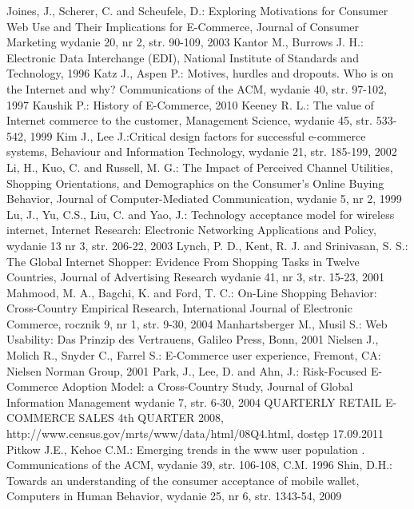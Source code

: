 {\begin{thebibliography}{5}
     Joines, J., Scherer, C. and Scheufele, D.: Exploring Motivations for Consumer Web Use and Their Implications for E-Commerce, Journal of Consumer Marketing wydanie 20, nr 2, str. 90-109, 2003
     Kantor M., Burrows J. H.: Electronic Data Interchange (EDI), National Institute of Standards and Technology, 1996
     Katz J., Aspen P.: Motives, hurdles and dropouts. Who is on the Internet and why? Communications of the ACM, wydanie 40, str. 97-102, 1997
     Kaushik P.: History of E-Commerce, 2010
     Keeney R. L.: The value of Internet commerce to the customer, Management Science, wydanie 45, str. 533-542, 1999
     Kim J., Lee J.:Critical design factors for successful e-commerce systems, Behaviour and Information Technology, wydanie 21, str. 185-199, 2002
     Li, H., Kuo, C. and Russell, M. G.: The Impact of Perceived Channel Utilities, Shopping Orientations, and Demographics on the Consumer's Online Buying Behavior, Journal of Computer-Mediated Communication, wydanie 5, nr 2, 1999
     Lu, J., Yu, C.S., Liu, C. and Yao, J.: Technology acceptance model for wireless internet, Internet Research: Electronic Networking Applications and Policy, wydanie 13 nr 3, str. 206-22, 2003
     Lynch, P. D., Kent, R. J. and Srinivasan, S. S.: The Global Internet Shopper: Evidence From Shopping Tasks in Twelve Countries, Journal of Advertising Research wydanie 41, nr 3, str. 15-23, 2001
     Mahmood, M. A., Bagchi, K. and Ford, T. C.: On-Line Shopping Behavior: Cross-Country Empirical Research, International Journal of Electronic Commerce, rocznik 9, nr 1, str. 9-30, 2004
     Manhartsberger M., Musil S.: Web Usability: Das Prinzip des Vertrauens, Galileo Press, Bonn, 2001
     Nielsen J., Molich R., Snyder C., Farrel S.: E-Commerce user experience, Fremont, CA: Nielsen Norman Group, 2001
     Park, J., Lee, D. and Ahn, J.: Risk-Focused E-Commerce Adoption Model: a Cross-Country Study, Journal of Global Information Management wydanie 7, str. 6-30, 2004
     QUARTERLY RETAIL E-COMMERCE SALES 4th QUARTER 2008, http://www.census.gov/mrts/www/data/html/08Q4.html, dostęp 17.09.2011
     Pitkow J.E., Kehoe C.M.: Emerging trends in the www user population . Communications of the ACM, wydanie 39, str. 106-108, C.M. 1996
     Shin, D.H.: Towards an understanding of the consumer acceptance of mobile wallet,
Computers in Human Behavior, wydanie 25, nr 6, str. 1343-54, 2009

\end{thebibliography}}
